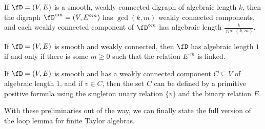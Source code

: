 \begin{prop} If $\fD = (V,E)$ is a smooth, weakly connected digraph of algebraic length $k$, then the digraph $\fD^{\circ m} = (V,E^{\circ m})$ has $\gcd(k,m)$ weakly connected components, and each weakly connected component of $\fD^{\circ m}$ has algebraic length $\frac{k}{\gcd(k,m)}$.
\end{prop}

\begin{prop}\label{prop-alg-length-linked} If $\fD = (V,E)$ is smooth and weakly connected, then $\fD$ has algebraic length $1$ if and only if there is some $m \ge 0$ such that the relation $E^{\circ m}$ is linked.
\end{prop}

\begin{cor} If $\fD = (V,E)$ is smooth and has a weakly connected component $C \subseteq V$ of algebraic length $1$, and if $v \in C$, then the set $C$ can be defined by a primitive positive formula using the singleton unary relation $\{v\}$ and the binary relation $E$.
\end{cor}

With these preliminaries out of the way, we can finally state the full version of the loop lemma for finite Taylor algebras.

